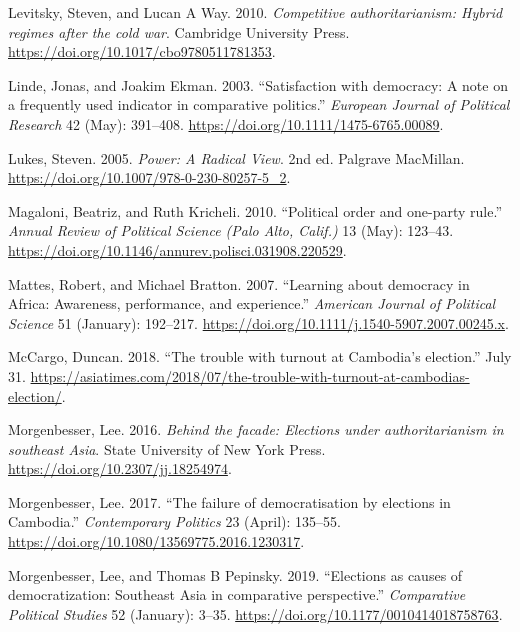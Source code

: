 \documentclass[
  12pt,
  letterpaper]{article}
\newlength{\cslhangindent}
\newenvironment{CSLReferences}[2] %
 {\begin{list}{}{%
  \setlength{\itemindent}{0pt}
  \setlength{\leftmargin}{0pt}
  \setlength{\parsep}{0pt}
  \ifodd #1
   \setlength{\leftmargin}{\cslhangindent}
   \setlength{\itemindent}{-1\cslhangindent}
  \fi
  \setlength{\itemsep}{#2\baselineskip}}}
 {\end{list}}
\begin{document}
\begin{CSLReferences}{1}{1}
Levitsky, Steven, and Lucan A Way. 2010. \emph{{Competitive
authoritarianism: Hybrid regimes after the cold war}}. Cambridge
University Press. \url{https://doi.org/10.1017/cbo9780511781353}.

Linde, Jonas, and Joakim Ekman. 2003. {``{Satisfaction with democracy: A
note on a frequently used indicator in comparative politics}.''}
\emph{European Journal of Political Research} 42 (May): 391--408.
\url{https://doi.org/10.1111/1475-6765.00089}.

Lukes, Steven. 2005. \emph{{Power: A Radical View}}. 2nd ed. Palgrave
MacMillan. \url{https://doi.org/10.1007/978-0-230-80257-5_2}.

Magaloni, Beatriz, and Ruth Kricheli. 2010. {``{Political order and
one-party rule}.''} \emph{Annual Review of Political Science (Palo Alto,
Calif.)} 13 (May): 123--43.
\url{https://doi.org/10.1146/annurev.polisci.031908.220529}.

Mattes, Robert, and Michael Bratton. 2007. {``{Learning about
{democracy} in {Africa}: Awareness, {performance}, and {experience}}.''}
\emph{American Journal of Political Science} 51 (January): 192--217.
\url{https://doi.org/10.1111/j.1540-5907.2007.00245.x}.

McCargo, Duncan. 2018. {``{The trouble with turnout at Cambodia's
election}.''} July 31.
\url{https://asiatimes.com/2018/07/the-trouble-with-turnout-at-cambodias-election/}.

Morgenbesser, Lee. 2016. \emph{{Behind the facade: Elections under
authoritarianism in southeast Asia}}. State University of New York
Press. \url{https://doi.org/10.2307/jj.18254974}.

Morgenbesser, Lee. 2017. {``{The failure of democratisation by elections
in Cambodia}.''} \emph{Contemporary Politics} 23 (April): 135--55.
\url{https://doi.org/10.1080/13569775.2016.1230317}.

Morgenbesser, Lee, and Thomas B Pepinsky. 2019. {``{Elections as causes
of democratization: Southeast Asia in comparative perspective}.''}
\emph{Comparative Political Studies} 52 (January): 3--35.
\url{https://doi.org/10.1177/0010414018758763}.


\end{CSLReferences}
\end{document}
